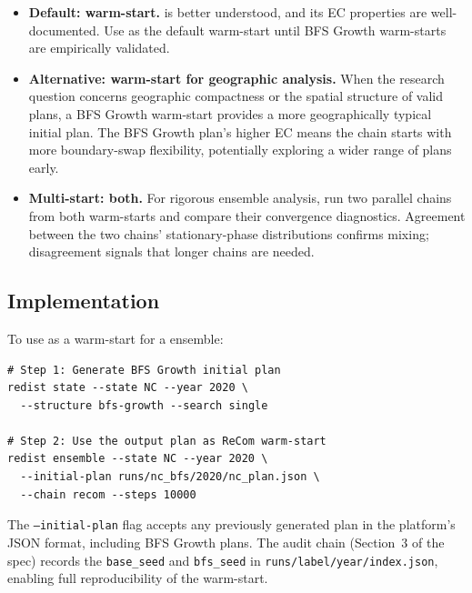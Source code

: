 \begin{itemize}
\item \textbf{Default: \metis{} warm-start.}
  \metis{} is better understood, and its EC properties are well-documented.
  Use \metis{} as the default warm-start until BFS Growth warm-starts
  are empirically validated.

\item \textbf{Alternative: \bfsg{} warm-start for geographic analysis.}
  When the research question concerns geographic compactness or the
  spatial structure of valid plans, a BFS Growth warm-start provides a
  more geographically typical initial plan.
  The BFS Growth plan's higher EC means the chain starts with more
  boundary-swap flexibility, potentially exploring a wider range of
  plans early.

\item \textbf{Multi-start: both.}
  For rigorous ensemble analysis, run two parallel chains from both
  warm-starts and compare their convergence diagnostics.
  Agreement between the two chains' stationary-phase distributions
  confirms mixing; disagreement signals that longer chains are needed.
\end{itemize}

\subsection{Implementation}

To use \bfsg{} as a warm-start for a \recom{} ensemble:

\begin{verbatim}
# Step 1: Generate BFS Growth initial plan
redist state --state NC --year 2020 \
  --structure bfs-growth --search single

# Step 2: Use the output plan as ReCom warm-start
redist ensemble --state NC --year 2020 \
  --initial-plan runs/nc_bfs/2020/nc_plan.json \
  --chain recom --steps 10000
\end{verbatim}

The \texttt{--initial-plan} flag accepts any previously generated plan
in the platform's JSON format, including BFS Growth plans.
The audit chain (Section~3 of the spec) records the \texttt{base\_seed}
and \texttt{bfs\_seed} in \texttt{runs/{label}/{year}/index.json},
enabling full reproducibility of the warm-start.
